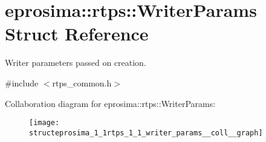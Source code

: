 \hypertarget{structeprosima_1_1rtps_1_1_writer_params}{\section{eprosima\-:\-:rtps\-:\-:\-Writer\-Params \-Struct \-Reference}
\label{structeprosima_1_1rtps_1_1_writer_params}
}


\-Writer parameters passed on creation.  




{\ttfamily \#include $<$rtps\-\_\-common.\-h$>$}



\-Collaboration diagram for eprosima\-:\-:rtps\-:\-:\-Writer\-Params\-:\nopagebreak
\begin{figure}[H]
\begin{center}
\leavevmode
\texttt{[image: structeprosima\_1\_1rtps\_1\_1\_writer\_params\_\_coll\_\_graph]}
\end{center}
\end{figure}
